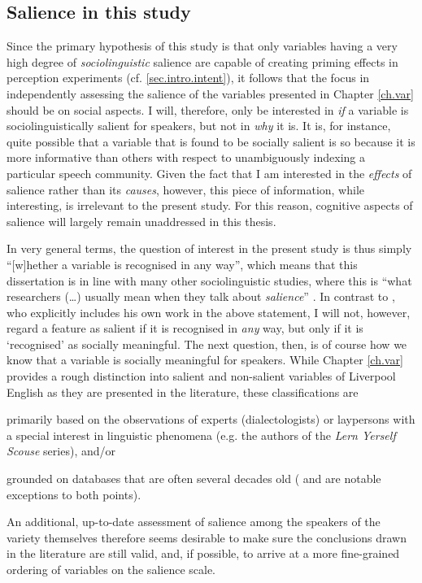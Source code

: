 		\subsection{Salience in this study}
		\label{sec.sal.sal.study}

Since the primary hypothesis of this study is that only variables having a very high degree of \emph{sociolinguistic} salience are capable of creating priming effects in perception experiments (cf. \ref{sec.intro.intent}), it follows that the focus in independently assessing the salience of the variables presented in Chapter \ref{ch.var} should be on social aspects.
I will, therefore, only be interested in \emph{if} a variable is sociolinguistically salient for speakers, but not in \emph{why} it is.
It is, for instance, quite possible that a variable that is found to be socially salient is so because it is more informative than others with respect to unambiguously indexing a particular speech community.
Given the fact that I am interested in the \emph{effects} of salience rather than its \emph{causes}, however, this piece of information, while interesting, is irrelevant to the present study.
For this reason, cognitive aspects of salience will largely remain unaddressed in this thesis.

In very general terms, the question of interest in the present study is thus simply ``[w]hether a variable is recognised in any way'', which means that this dissertation is in line with many other sociolinguistic studies, where this is ``what researchers (\dots) usually mean when they talk about \emph{salience}'' \parencite[4, emphasis in original]{racz2013}.
In contrast to \textcite{racz2013}, who explicitly includes his own work in the above statement, I will not, however, regard a feature as salient if it is recognised in \emph{any} way, but only if it is `recognised' as socially meaningful.
The next question, then, is of course how we know that a variable is socially meaningful for speakers.
While Chapter \ref{ch.var} provides a rough distinction into salient and non-salient variables of Liverpool English as they are presented in the literature, these classifications are
\begin{inparaenum}[(1)]
	\item primarily based on the observations of experts (dialectologists) or laypersons with a special interest in linguistic phenomena (e.g. the authors of the \emph{Lern Yerself Scouse} series), and/or
	\item grounded on databases that are often several decades old (\citealt{watsonclark2013} and \citealt{watsonclark2015} are notable exceptions to both points).
\end{inparaenum}
An additional, up-to-date assessment of salience among the speakers of the variety themselves therefore seems desirable to make sure the conclusions drawn in the literature are still valid, and, if possible, to arrive at a more fine-grained ordering of variables on the salience scale.

